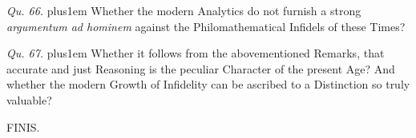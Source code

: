 \item{\it Qu. 66.} \hskip 0pt plus1em
Whether the modern Analytics do not furnish a strong {\it
argumentum ad hominem\/} against the Philomathematical Infidels
of these Times?

\item{\it Qu. 67.} \hskip 0pt plus1em
Whether it follows from the abovementioned Remarks, that accurate
and just Reasoning is the peculiar Character of the present Age?
And whether the modern Growth of Infidelity can be ascribed to a
Distinction so truly valuable?

\nobreak\vskip12pt

\centerline{\Largerm FINIS.}

\par\endgroup

\bye
